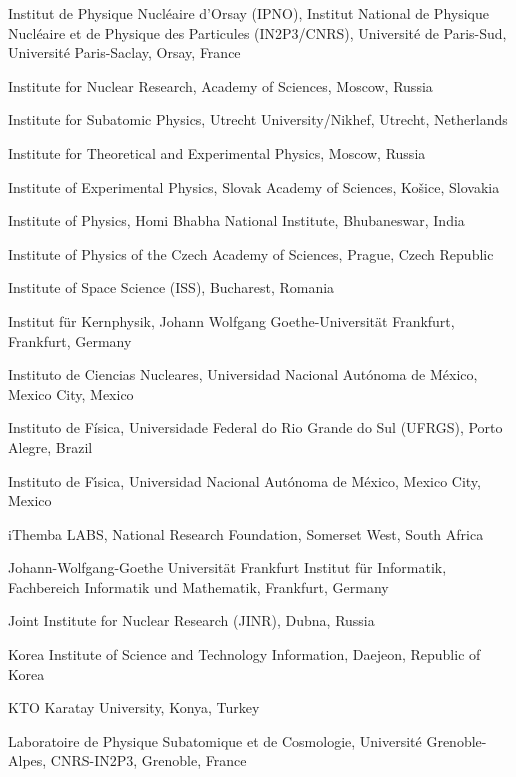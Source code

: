 \begin{flushleft}
\begin{Authlist}
\item {}Institut de Physique Nucl\'{e}aire d'Orsay (IPNO), Institut National de Physique Nucl\'{e}aire et de Physique des Particules (IN2P3/CNRS), Universit\'{e} de Paris-Sud, Universit\'{e} Paris-Saclay, Orsay, France
\item {}Institute for Nuclear Research, Academy of Sciences, Moscow, Russia
\item {}Institute for Subatomic Physics, Utrecht University/Nikhef, Utrecht, Netherlands
\item {}Institute for Theoretical and Experimental Physics, Moscow, Russia
\item {}Institute of Experimental Physics, Slovak Academy of Sciences, Ko\v{s}ice, Slovakia
\item {}Institute of Physics, Homi Bhabha National Institute, Bhubaneswar, India
\item {}Institute of Physics of the Czech Academy of Sciences, Prague, Czech Republic
\item {}Institute of Space Science (ISS), Bucharest, Romania
\item {}Institut f\"{u}r Kernphysik, Johann Wolfgang Goethe-Universit\"{a}t Frankfurt, Frankfurt, Germany
\item {}Instituto de Ciencias Nucleares, Universidad Nacional Aut\'{o}noma de M\'{e}xico, Mexico City, Mexico
\item {}Instituto de F\'{i}sica, Universidade Federal do Rio Grande do Sul (UFRGS), Porto Alegre, Brazil
\item {}Instituto de F\'{\i}sica, Universidad Nacional Aut\'{o}noma de M\'{e}xico, Mexico City, Mexico
\item {}iThemba LABS, National Research Foundation, Somerset West, South Africa
\item {}Johann-Wolfgang-Goethe Universit\"{a}t Frankfurt Institut f\"{u}r Informatik, Fachbereich Informatik und Mathematik, Frankfurt, Germany
\item {}Joint Institute for Nuclear Research (JINR), Dubna, Russia
\item {}Korea Institute of Science and Technology Information, Daejeon, Republic of Korea
\item {}KTO Karatay University, Konya, Turkey
\item {}Laboratoire de Physique Subatomique et de Cosmologie, Universit\'{e} Grenoble-Alpes, CNRS-IN2P3, Grenoble, France

\end{Authlist}
\end{flushleft}

